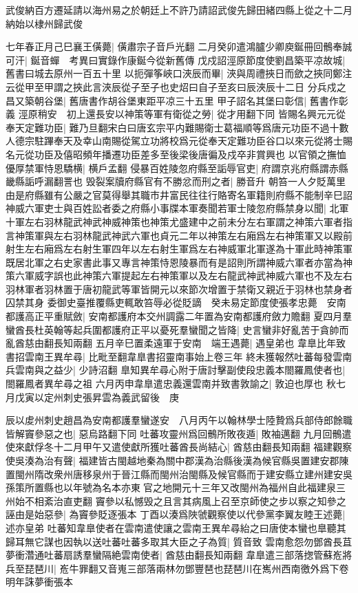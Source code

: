 武俊納百方遷延請以海州易之於朝廷上不許乃請詔武俊先歸田緒四縣上從之十二月納始以棣州歸武俊

七年春正月己巳襄王僙薨|{
	僙肅宗子音戶光翻}
二月癸卯遣鴻臚少卿庾鋋冊回鶻奉誠可汗|{
	鋋音蟬　考異曰實錄作康鋋今從新舊傳}
戊戍詔涇原節度使劉昌築平凉故城|{
	舊書曰城去原州一百五十里}
以扼彈筝峽口浹辰而畢|{
	浹與周禮挾日而歛之挾同鄭注云從甲至甲謂之挾此言浹辰從子至子也史炤曰自子至亥曰辰浹辰十二日}
分兵戍之昌又築朝谷堡|{
	舊唐書作胡谷堡東距平凉三十五里}
甲子詔名其堡曰彰信|{
	舊書作彰義}
涇原稍安　初上還長安以神策等軍有衛從之勞|{
	從才用翻下同}
皆賜名興元元從奉天定難功臣|{
	難乃旦翻宋白曰唐玄宗平内難賜衛士葛福順等爲唐元功臣不過十數人德宗駐蹕奉天及幸山南賜從駕立功將校爲元從奉天定難功臣谷口以來元從將士賜名元從功臣及僖昭頻年播遷功臣差多至後梁後唐徧及戍卒非賞興也}
以官領之撫恤優厚禁軍恃恩驕横|{
	横戶孟翻}
侵暴百姓陵忽府縣至詬辱官吏|{
	府謂京兆府縣謂赤縣畿縣詬呼漏翻詈也}
毁裂案牘府縣官有不勝忿而刑之者|{
	勝音升}
朝笞一人夕貶萬里由是府縣雖有公嚴之官莫得舉其職市井富民往往行賂寄名軍籍則府縣不能制辛巳詔神威六軍吏士與百姓訟者委之府縣小事牒本軍奏聞若軍士陵忽府縣禁身以聞|{
	北軍十軍左右羽林龍武神武神威神策也神策尤盛建中之前未分左右軍謂之神策六軍者指言神策軍與左右羽林龍武神武六軍也貞元二年以神策左右廂爲左右神策軍又以殿前射生左右廂爲左右射生軍四年以左右射生軍爲左右神威軍北軍遂為十軍此時神策軍既居北軍之右史家書此事又專言神策恃恩陵暴而有是詔則所謂神威六軍者亦當為神策六軍威字誤也此神策六軍提起左右神策軍以及左右龍武神武神威六軍也不及左右羽林軍者羽林置于唐初龍武等軍皆開元以來節次增置于禁衛又親近于羽林也禁身者囚禁其身}
委御史臺推覆縣吏輒敢笞辱必從貶謫　癸未易定節度使張孝忠薨　安南都護高正平重賦斂|{
	安南都護府本交州調露二年置為安南都護府斂力贍翻}
夏四月羣蠻酋長杜英翰等起兵圍都護府正平以憂死羣蠻聞之皆降|{
	史言蠻非好亂苦于貪帥而亂酋慈由翻長知兩翻}
五月辛巳置柔遠軍于安南　端王遇薨|{
	遇皇弟也}
韋臯比年致書招雲南王異牟尋|{
	比毗至翻韋臯書招靈南事始上卷三年}
終未獲報然吐蕃每發雲南兵雲南與之益少|{
	少詩沼翻}
臯知異牟尋心附于唐討擊副使段忠義本閤羅鳳使者也|{
	閤羅鳳者異牟尋之祖}
六月丙申韋臯遣忠義還雲南并致書敦諭之|{
	敦迫也厚也}
秋七月戊寅以定州刺史張昇雲為義武留後　庚

辰以䖍州刺史趙昌為安南都護羣蠻遂安　八月丙午以翰林學士陸贄爲兵部侍郎餘職皆解竇參惡之也|{
	惡烏路翻下同}
吐蕃攻靈州爲回鶻所敗夜遁|{
	敗袖邁翻}
九月回鶻遣使來獻俘冬十二月甲午又遣使獻所獲吐蕃酋長尚結心|{
	酋慈由翻長知兩翻}
福建觀察使吳湊為治有聲|{
	福建皆古閩越地秦為關中郡漢為治縣後漢為候官縣吳置建安郡陳置閩州隋改衆州唐移泉州于晉江縣而閩州治閩縣及候官縣而于建安縣立建州建安吳孫策所置縣也以年號為名本亦東官之地開元十三年又改閩州為福州自此福建泉三州始不相紊治直吏翻}
竇參以私憾毁之且言其病風上召至京師使之步以察之知參之誣由是始惡參|{
	為竇參貶逐張本}
丁酉以湊爲陜虢觀察使以代參黨李翼友睦王述薨|{
	述亦皇弟}
吐蕃知韋臯使者在雲南遣使讓之雲南王異牟尋紿之曰唐使本蠻也臯聽其歸耳無它謀也因執以送吐蕃吐蕃多取其大臣之子為質|{
	質音致}
雲南愈怨勿鄧酋長苴夢衝濳通吐蕃扇誘羣蠻隔絶雲南使者|{
	酋慈由翻長知兩翻}
韋臯遣三部落揔管蘇峞將兵至琵琶川|{
	峞牛罪翻又音嵬三部落兩林勿鄧豐琶也琵琶川在嶲州西南徼外爲下卷明年誅夢衝張本}


